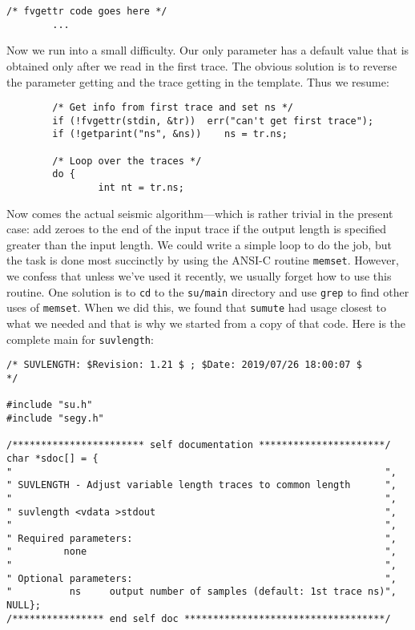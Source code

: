{{{{{{{{\begin{verbatim}
/* fvgettr code goes here */
        ...

\end{verbatim}}\noindent
Now we run into a small difficulty.  Our only parameter has a default
value that is obtained only after we read in the first trace.  The
obvious solution is to reverse the parameter getting and the trace
getting in the template.  Thus we resume:
{\small\begin{verbatim}
        /* Get info from first trace and set ns */ 
        if (!fvgettr(stdin, &tr))  err("can't get first trace"); 
        if (!getparint("ns", &ns))    ns = tr.ns;

        /* Loop over the traces */
        do {
                int nt = tr.ns;
\end{verbatim}}\noindent
Now comes the actual seismic algorithm---which is rather trivial in
the present case:  add zeroes to the end of the input trace if the
output length is specified greater than the input length.  We could
write a simple loop to do the job, but the task is done most
succinctly by using the {\sf ANSI-C} routine {\tt memset}.  However, we
confess that unless we've used it recently, we usually forget how to
use this routine.  One solution is to {\tt cd} to the {\tt su/main}
directory and use {\tt grep} to find other uses of {\tt memset}.  When
we did this, we found that {\tt sumute} had usage closest to what we
needed and that is why we started from a copy of that code.  Here is
the complete main for {\tt suvlength}:
{\small\begin{verbatim}
/* SUVLENGTH: $Revision: 1.21 $ ; $Date: 2019/07/26 18:00:07 $        */

#include "su.h"
#include "segy.h"

/*********************** self documentation **********************/
char *sdoc[] = {
"                                                                 ",
" SUVLENGTH - Adjust variable length traces to common length      ",
"                                                                 ",
" suvlength <vdata >stdout                                        ",
"                                                                 ",
" Required parameters:                                            ",
"         none                                                    ",
"                                                                 ",
" Optional parameters:                                            ",
"          ns     output number of samples (default: 1st trace ns)",
NULL};
/**************** end self doc ***********************************/


\end{verbatim}}}}}}}}}
